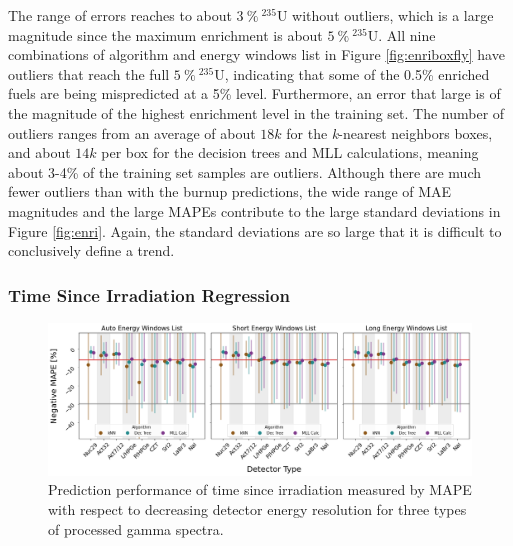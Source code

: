 The range of errors reaches to about $3\:\%\:{}^{235}\text{U}$ without
outliers, which is a large magnitude since the maximum enrichment is about
$5\:\%\:{}^{235}\text{U}$. All nine combinations of algorithm and energy
windows list in Figure \ref{fig:enriboxfly} have outliers that reach the full
$5\:\%\:{}^{235}\text{U}$, indicating that some of the 0.5\% enriched fuels are
being mispredicted at a 5\% level.  Furthermore, an error that large is of the
magnitude of the highest enrichment level in the training set.  The number of
outliers ranges from an average of about $18k$ for the \textit{k}-nearest
neighbors boxes, and about $14k$ per box for the decision trees and \gls{MLL}
calculations, meaning about 3-4\% of the training set samples are outliers.
Although there are much fewer outliers than with the burnup predictions, the
wide range of \gls{MAE} magnitudes and the large \gls{MAPE}s contribute to the
large standard deviations in Figure \ref{fig:enri}. Again, the standard
deviations are so large that it is difficult to conclusively define a trend.

\subsubsection{Time Since Irradiation Regression}

\begin{figure}[!htb]
  \centering
  \includegraphics[width=\textwidth]{./chapters/exp2/detector_preds_wrt_enlist_MAPE_cool.png}
  \caption[Prediction performance of time since irradiation regression with 
           decreasing detector energy resolution]
           {Prediction performance of time since irradiation measured by 
           \acrshort{MAPE} with respect to decreasing detector energy resolution
           for three types of processed gamma spectra.}
  \label{fig:cool}
\end{figure}

